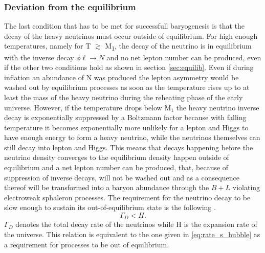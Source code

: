 \subsubsection{Deviation from the equilibrium}
The last condition that has to be met for successfull baryogenesis is that the decay of the heavy neutrinos must occur outside of equilibrium. For high enough temperatures, namely for T $\gtrsim$ M\textsubscript{1}, the decay of the neutrino is in equilibrium with the inverse decay $\phi\ell\rightarrow N$ and no net lepton number can be produced, even if the other two conditions hold as shown in section \ref{sec:equilib}. Even if during inflation an abundance of N was produced the lepton asymmetry would be washed out by equilibrium processes as soon as the temperature rises up to at least the mass of the heavy neutrino during the reheating phase of the early universe. \newline\indent
However, if the temperature drops below M$_1$ the heavy neutrino inverse decay is exponentially suppressed by a Boltzmann factor because with falling temperature it becomes exponentially more unlikely for a lepton and Higgs to have enough energy to form a heavy neutrino, while the neutrinos themselves can still decay into lepton and Higgs. This means that decays happening before the neutrino density converges to the equilibrium density happen outside of equilibrium and a net lepton number can be produced, that, because of suppression of inverse decays, will not be washed out and as a consequence thereof will be transformed into a baryon abundance through the $B+L$ violating electroweak sphaleron processes.\newline\indent
The requirement for the neutrino decay to be slow enough to sustain its out-of-equilibrium state is the following \cite[p. 30]{Taanila:2008}.
\begin{equation}
	\Gamma_D<H.
	\label{eq:out_of_eq}
\end{equation}
$\Gamma_D$ denotes the total decay rate of the neutrinos while H is the expansion rate of the universe. This relation is equivalent to the one given in \eqref{eq:rate_s_hubble} as a requirement for processes to be out of equilibrium. 